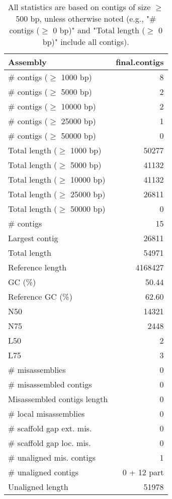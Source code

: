 \documentclass[12pt,a4paper]{article}
\begin{document}
\begin{table}[ht]
\begin{center}
\caption{All statistics are based on contigs of size $\geq$ 500 bp, unless otherwise noted (e.g., "\# contigs ($\geq$ 0 bp)" and "Total length ($\geq$ 0 bp)" include all contigs).}
\begin{tabular}{|l*{1}{|r}|}
\hline
Assembly & final.contigs \\ \hline
\# contigs ($\geq$ 1000 bp) & 8 \\ \hline
\# contigs ($\geq$ 5000 bp) & 2 \\ \hline
\# contigs ($\geq$ 10000 bp) & 2 \\ \hline
\# contigs ($\geq$ 25000 bp) & 1 \\ \hline
\# contigs ($\geq$ 50000 bp) & 0 \\ \hline
Total length ($\geq$ 1000 bp) & 50277 \\ \hline
Total length ($\geq$ 5000 bp) & 41132 \\ \hline
Total length ($\geq$ 10000 bp) & 41132 \\ \hline
Total length ($\geq$ 25000 bp) & 26811 \\ \hline
Total length ($\geq$ 50000 bp) & 0 \\ \hline
\# contigs & 15 \\ \hline
Largest contig & 26811 \\ \hline
Total length & 54971 \\ \hline
Reference length & 4168427 \\ \hline
GC (\%) & 50.44 \\ \hline
Reference GC (\%) & 62.60 \\ \hline
N50 & 14321 \\ \hline
N75 & 2448 \\ \hline
L50 & 2 \\ \hline
L75 & 3 \\ \hline
\# misassemblies & 0 \\ \hline
\# misassembled contigs & 0 \\ \hline
Misassembled contigs length & 0 \\ \hline
\# local misassemblies & 0 \\ \hline
\# scaffold gap ext. mis. & 0 \\ \hline
\# scaffold gap loc. mis. & 0 \\ \hline
\# unaligned mis. contigs & 1 \\ \hline
\# unaligned contigs & 0 + 12 part \\ \hline
Unaligned length & 51978 \\ \hline

\end{tabular}
\end{center}
\end{table}
\end{document}
